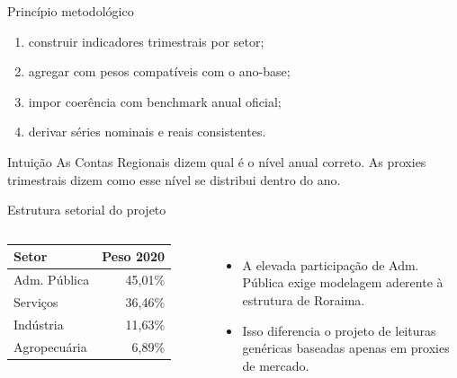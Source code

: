 \documentclass[aspectratio=169,11pt]{beamer}
\begin{document}
\begin{frame}{Princípio metodológico}
\begin{enumerate}
  \item construir indicadores trimestrais por setor;
  \item agregar com pesos compatíveis com o ano-base;
  \item impor coerência com benchmark anual oficial;
  \item derivar séries nominais e reais consistentes.
\end{enumerate}

\vspace{0.3cm}
\begin{block}{Intuição}
As Contas Regionais dizem qual é o nível anual correto. As proxies trimestrais dizem como esse nível se distribui dentro do ano.
\end{block}
\end{frame}

\begin{frame}{Estrutura setorial do projeto}
\begin{columns}[T]
\small
\begin{tabular}{lr}
\toprule
\textbf{Setor} & \textbf{Peso 2020} \\
\midrule
Adm. Pública & 45,01\% \\
Serviços & 36,46\% \\
Indústria & 11,63\% \\
Agropecuária & 6,89\% \\
\bottomrule
\end{tabular}

\vspace{0.35cm}
\begin{itemize}
  \item A elevada participação de Adm. Pública exige modelagem aderente à estrutura de Roraima.
  \item Isso diferencia o projeto de leituras genéricas baseadas apenas em proxies de mercado.
\end{itemize}

\centering
{}
\end{columns}
\end{frame}
\end{document}
